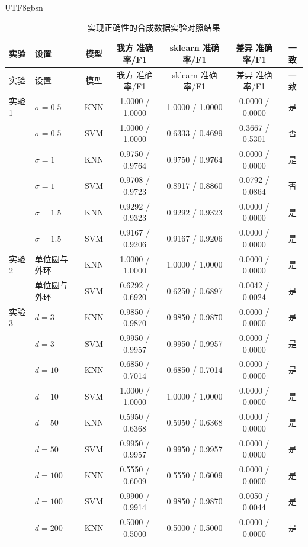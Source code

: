 \documentclass{article}
\begin{document}
\begin{CJK}{UTF8}{gbsn}
{\normalsize
\setlength{\tabcolsep}{3.5pt}
\begin{longtable}{@{}llccccc@{}}
\caption{实现正确性的合成数据实验对照结果}
\label{tab:verify_syn}\\
\toprule
实验 & 设置 & 模型 & 我方 准确率/F1 & sklearn 准确率/F1 & 差异 准确率/F1 & 一致 \\
\midrule
\endfirsthead
\toprule
实验 & 设置 & 模型 & 我方 准确率/F1 & sklearn 准确率/F1 & 差异 准确率/F1 & 一致 \\
\midrule
\endhead
\bottomrule
\endlastfoot
实验 1 & $\sigma=0.5$ & KNN & 1.0000 / 1.0000 & 1.0000 / 1.0000 & 0.0000 / 0.0000 & 是 \\
 & $\sigma=0.5$ & SVM & 1.0000 / 1.0000 & 0.6333 / 0.4699 & 0.3667 / 0.5301 & 否 \\
 & $\sigma=1$ & KNN & 0.9750 / 0.9764 & 0.9750 / 0.9764 & 0.0000 / 0.0000 & 是 \\
 & $\sigma=1$ & SVM & 0.9708 / 0.9723 & 0.8917 / 0.8860 & 0.0792 / 0.0864 & 否 \\
 & $\sigma=1.5$ & KNN & 0.9292 / 0.9323 & 0.9292 / 0.9323 & 0.0000 / 0.0000 & 是 \\
 & $\sigma=1.5$ & SVM & 0.9167 / 0.9206 & 0.9167 / 0.9206 & 0.0000 / 0.0000 & 是 \\
实验 2 & 单位圆与外环 & KNN & 1.0000 / 1.0000 & 1.0000 / 1.0000 & 0.0000 / 0.0000 & 是 \\
 & 单位圆与外环 & SVM & 0.6292 / 0.6920 & 0.6250 / 0.6897 & 0.0042 / 0.0024 & 是 \\
实验 3 & $d=3$ & KNN & 0.9850 / 0.9870 & 0.9850 / 0.9870 & 0.0000 / 0.0000 & 是 \\
 & $d=3$ & SVM & 0.9950 / 0.9957 & 0.9950 / 0.9957 & 0.0000 / 0.0000 & 是 \\
 & $d=10$ & KNN & 0.6850 / 0.7014 & 0.6850 / 0.7014 & 0.0000 / 0.0000 & 是 \\
 & $d=10$ & SVM & 1.0000 / 1.0000 & 1.0000 / 1.0000 & 0.0000 / 0.0000 & 是 \\
 & $d=50$ & KNN & 0.5950 / 0.6368 & 0.5950 / 0.6368 & 0.0000 / 0.0000 & 是 \\
 & $d=50$ & SVM & 0.9950 / 0.9957 & 0.9950 / 0.9957 & 0.0000 / 0.0000 & 是 \\
 & $d=100$ & KNN & 0.5550 / 0.6009 & 0.5550 / 0.6009 & 0.0000 / 0.0000 & 是 \\
 & $d=100$ & SVM & 0.9900 / 0.9914 & 0.9850 / 0.9870 & 0.0050 / 0.0044 & 是 \\
 & $d=200$ & KNN & 0.5000 / 0.5000 & 0.5000 / 0.5000 & 0.0000 / 0.0000 & 是 \\

\end{longtable}}
\end{CJK}
\end{document}
